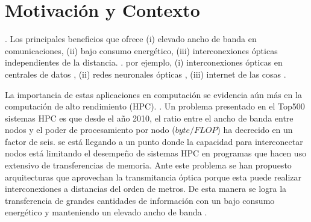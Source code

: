 \chapter{Motivación y Contexto}

.
Los principales beneficios que ofrece  (i) elevado ancho de banda en comunicaciones, (ii) bajo consumo energético, (iii) interconexiones ópticas independientes de la distancia.
.
 por ejemplo,
(i) interconexiones ópticas en centrales de datos \citep{Shen2019}, 
(ii) redes neuronales ópticas  \citep{Shen2017}, 
(iii) internet de las cosas  \citep{Glick2018}.


La importancia de estas aplicaciones en computación se evidencia aún más en la computación de alto rendimiento (HPC).
.
Un problema presentado en el Top500 sistemas HPC es que desde el año 2010, el ratio entre el ancho de banda entre nodos y el poder de procesamiento por nodo ($byte / FLOP$) ha decrecido en un factor de seis.
 se está llegando a un punto donde la capacidad para interconectar nodos está limitando el desempeño de sistemas HPC en programas que hacen uso extensivo de transferencias de memoria.
Ante este problema se han propuesto arquitecturas que aprovechan  la transmitancia óptica porque esta puede realizar interconexiones a distancias del orden de metros. 
De esta manera se logra la transferencia de grandes cantidades de información con un bajo consumo energético y manteniendo un elevado ancho de banda \citep{Shen2019, Anderson2018}.

